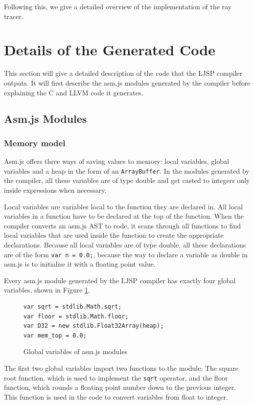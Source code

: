 \documentclass[11pt]{report}
\begin{document}
Following this, we give a detailed overview of the implementation of the ray tracer.

\section{Details of the Generated Code}
This section will give a detailed description of the code that the LJSP compiler outputs. It will first describe the asm.js modules generated by the compiler before explaining the C and LLVM code it generates.

\subsection{Asm.js Modules}
\subsubsection{Memory model}
Asm.js offers three ways of saving values to memory: local variables, global variables and a heap in the form of an \texttt{ArrayBuffer}. In the modules generated by the compiler, all these variables are of type double and get casted to integers only inside expressions when necessary.

Local variables are variables local to the function they are declared in. All local variables in a function have to be declared at the top of the function. When the compiler converts an asm.js AST to code, it scans through all functions to find local variables that are used inside the function to create the appropriate declarations. Because all local variables are of type double, all these declarations are of the form \texttt{var n = 0.0;}, because the way to declare a variable as double in asm.js is to initialise it with a floating point value.

Every asm.js module generated by the LJSP compiler has exactly four global variables, shown in Figure \ref{iasmjsmm1}. 
\begin{figure}[ht]
\begin{lstlisting}
var sqrt = stdlib.Math.sqrt;
var floor = stdlib.Math.floor;
var D32 = new stdlib.Float32Array(heap);
var mem_top = 0.0;
\end{lstlisting}
\caption{Global variables of asm.js modules}
\label{iasmjsmm1}
\end{figure}

The first two global variables import two functions to the module: The square root function, which is used to implement the \texttt{sqrt} operator, and the floor function, which rounds a floating point number down to the previous integer. This function is used in the code to convert variables from float to integer.
\end{document}
